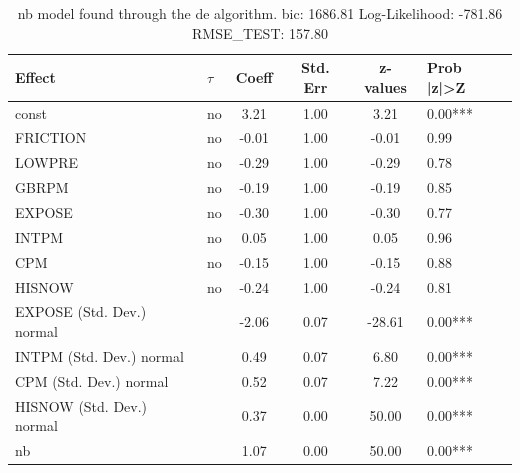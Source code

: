 \begin{table}
	\caption{nb model found through the de algorithm. bic: 1686.81 Log-Likelihood: -781.86 RMSE_TEST: 157.80}
	\begin{center}
		\begin{tabular}{|l|l|c|c|c|l|}
			\hline
			Effect & $\tau$ & Coeff & Std. Err & z-values & Prob |z|>Z \\
			\hline
			const & no & 3.21 & 1.00 & 3.21 & 0.00*** \\
			\hline
			FRICTION & no & -0.01 & 1.00 & -0.01 & 0.99 \\
			\hline
			LOWPRE & no & -0.29 & 1.00 & -0.29 & 0.78 \\
			\hline
			GBRPM & no & -0.19 & 1.00 & -0.19 & 0.85 \\
			\hline
			EXPOSE & no & -0.30 & 1.00 & -0.30 & 0.77 \\
			\hline
			INTPM & no & 0.05 & 1.00 & 0.05 & 0.96 \\
			\hline
			CPM & no & -0.15 & 1.00 & -0.15 & 0.88 \\
			\hline
			HISNOW & no & -0.24 & 1.00 & -0.24 & 0.81 \\
			\hline
			EXPOSE (Std. Dev.) normal &  & -2.06 & 0.07 & -28.61 & 0.00*** \\
			\hline
			INTPM (Std. Dev.) normal &  & 0.49 & 0.07 & 6.80 & 0.00*** \\
			\hline
			CPM (Std. Dev.) normal &  & 0.52 & 0.07 & 7.22 & 0.00*** \\
			\hline
			HISNOW (Std. Dev.) normal &  & 0.37 & 0.00 & 50.00 & 0.00*** \\
			\hline
			nb &  & 1.07 & 0.00 & 50.00 & 0.00*** \\
			\hline
		\end{tabular}
	\end{center}
\end{table}